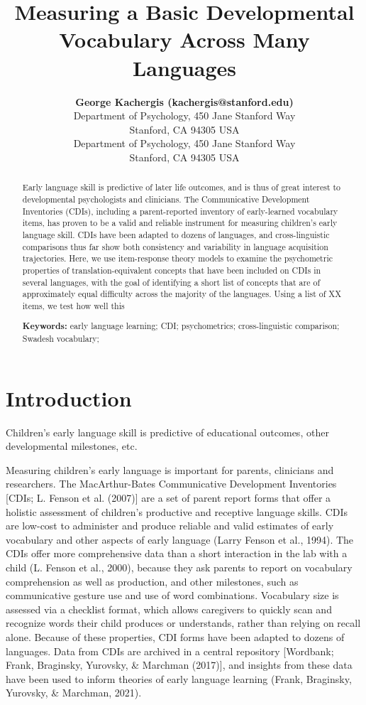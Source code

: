 \documentclass[10pt, letterpaper]{article}
\title{Measuring a Basic Developmental Vocabulary Across Many Languages}
\author{{\large \bf George Kachergis (kachergis@stanford.edu)} \\ Department of Psychology, 450 Jane Stanford Way \\ Stanford, CA 94305 USA \AND {\large \bf Michael C. Frank (mcfrank@stanford.edu)} \\ Department of Psychology, 450 Jane Stanford Way \\ Stanford, CA 94305 USA}
\begin{document}
\maketitle

\begin{abstract}
Early language skill is predictive of later life outcomes, and is thus
of great interest to developmental psychologists and clinicians. The
Communicative Development Inventories (CDIs), including a
parent-reported inventory of early-learned vocabulary items, has proven
to be a valid and reliable instrument for measuring children's early
language skill. CDIs have been adapted to dozens of languages, and
cross-linguistic comparisons thus far show both consistency and
variability in language acquisition trajectories. Here, we use
item-response theory models to examine the psychometric properties of
translation-equivalent concepts that have been included on CDIs in
several languages, with the goal of identifying a short list of concepts
that are of approximately equal difficulty across the majority of the
languages. Using a list of XX items, we test how well this

\textbf{Keywords:}
early language learning; CDI; psychometrics; cross-linguistic
comparison; Swadesh vocabulary;
\end{abstract}

\hypertarget{introduction}{%
\section{Introduction}\label{introduction}}

Children's early language skill is predictive of educational outcomes,
other developmental milestones, etc.

Measuring children's early language is important for parents, clinicians
and researchers. The MacArthur-Bates Communicative Development
Inventories {[}CDIs; L. Fenson et al. (2007){]} are a set of parent
report forms that offer a holistic assessment of children's productive
and receptive language skills. CDIs are low-cost to administer and
produce reliable and valid estimates of early vocabulary and other
aspects of early language (Larry Fenson et al., 1994). The CDIs offer
more comprehensive data than a short interaction in the lab with a child
(L. Fenson et al., 2000), because they ask parents to report on
vocabulary comprehension as well as production, and other milestones,
such as communicative gesture use and use of word combinations.
Vocabulary size is assessed via a checklist format, which allows
caregivers to quickly scan and recognize words their child produces or
understands, rather than relying on recall alone. Because of these
properties, CDI forms have been adapted to dozens of languages. Data
from CDIs are archived in a central repository {[}Wordbank; Frank,
Braginsky, Yurovsky, \& Marchman (2017){]}, and insights from these data
have been used to inform theories of early language learning (Frank,
Braginsky, Yurovsky, \& Marchman, 2021).
\end{document}

